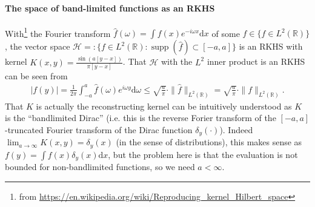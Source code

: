 \documentclass{scrartcl}
\theoremstyle{definition}
\theoremstyle{remark}
\newcommand{\de}{\mathrm d}
\newcommand{\R}{\mathbb R}
\begin{document}
{\paragraph{The space of band-limited functions as an RKHS}
With\footnote{from \url{https://en.wikipedia.org/wiki/Reproducing_kernel_Hilbert_space}} the Fourier transform $\hat f(\omega) = \int f(x) e^{-i\omega x}\de x$ of some $f\in \{f\in L^2(\R)\}$, the vector space $\mathcal H = : \{f\in L^2(\R):\operatorname{supp}(\hat f)\subset [-a,a]\}$ is an RKHS with kernel $K(x,y) = \frac{\sin(a[y-x])}{\pi[y-x]}$. That $\mathcal H$ with the $L^2$ inner product is an RKHS can be seen from 
\begin{align*}
|f(y)| = \frac{1}{2\pi} \int_{-a}^a \hat f(\omega) e^{i\omega y} \de \omega \leq \sqrt{\frac{a}{\pi}}\cdot \|\hat f\|_{L^2(\R)} = \sqrt{\frac{a}{\pi}}\cdot \|f\|_{L^2(\R)}.
\end{align*}
That $K$ is actually the reconstructing kernel can be intuitively understood as $K$ is the ``bandlimited Dirac'' (i.e. this is the reverse Forier transform of the $[-a,a]$-truncated Fourier transform of the Dirac function $\delta_y(\cdot)$). Indeed $\lim_{a\to\infty} K(x,y) = \delta_y(x)$ (in the sense of distributions), this makes sense as $f(y) = \int f(x) \delta_y(x)\de x$, but the problem here is that the evaluation is not bounded for non-bandlimited functions, so we need $a<\infty$. 

}
\end{document}
